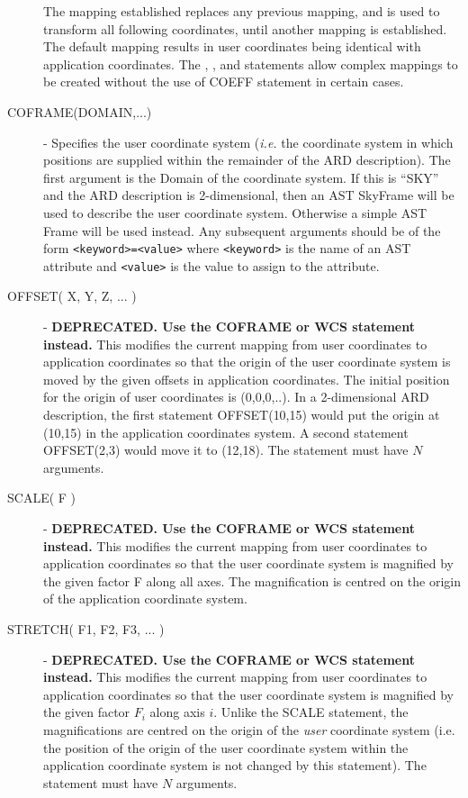 \begin{description}
The mapping established replaces any previous mapping, and is used to transform
all following coordinates, until another mapping is established. The default
mapping results in user coordinates being identical with application
coordinates. The , ,  and  statements allow complex
mappings to be created without the use of COEFF statement in certain cases. 

\item [\label{ST:COFRAME}COFRAME(DOMAIN,...)] - Specifies the user
coordinate system ({\em i.e.} the coordinate system in which positions
are supplied within the remainder of the ARD description). The first
argument is the Domain of the coordinate system. If this is ``SKY'' and
the ARD description is 2-dimensional, then an AST SkyFrame will be used
to describe the user coordinate system. Otherwise a simple AST Frame
will be used instead. Any subsequent arguments should be of the form 
{\tt <keyword>=<value>} where {\tt <keyword>} is the name of an AST
attribute and {\tt <value>} is the value to assign to the attribute.

\item [\label{ST:OFF}OFFSET( X, Y, Z, ... )] - {\bf DEPRECATED. Use the COFRAME or WCS statement instead.} This modifies the current mapping
from user coordinates to application coordinates so that the origin of the
user coordinate system is moved by the given offsets in application
coordinates. The initial position for the origin of user coordinates is
(0,0,0,..). In a 2-dimensional ARD description, the first statement OFFSET(10,15)
would put the origin at (10,15) in the application coordinates system. A second
statement OFFSET(2,3) would move it to (12,18). The statement must have $N$ 
arguments.

\item [\label{ST:SCA}SCALE( F )] - {\bf DEPRECATED. Use the COFRAME or WCS statement instead.} This modifies the current mapping from user coordinates to
application coordinates so that the user coordinate system is magnified by the
given factor F along all axes. The magnification is centred on the origin of the
application coordinate system. 

\item [\label{ST:STR}STRETCH( F1, F2, F3, ... )] - {\bf DEPRECATED. Use the COFRAME or WCS statement instead.} This modifies the current mapping from user
coordinates to application coordinates so that the user coordinate system is
magnified by the given factor $F_{i}$ along axis $i$. Unlike the SCALE
statement, the magnifications are centred on the origin of the {\em user}
coordinate system (i.e. the position of the origin of the user coordinate
system within the application coordinate system is not changed by this
statement). The statement must have $N$ arguments. 


\end{description}
